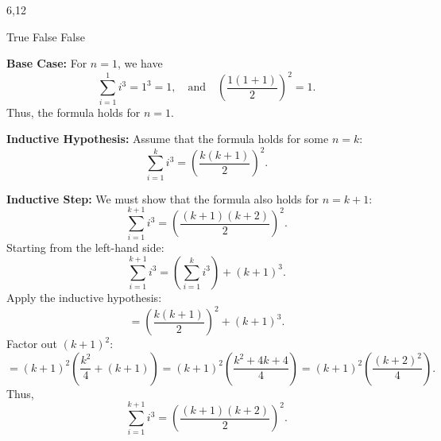 \documentclass[12pt,twoside]{article}
\begin{document}

\begin{problems}

\problem  %

\begin{problemparts}
\problempart %
{6,12}
\end{problemparts}

\problem  %

\begin{problemparts}
\end{problemparts}

\problem  %

\begin{problemparts}
\problempart %
True
\problempart %
False
\problempart %
False
\end{problemparts}

\problem  %


\textbf{Base Case:} For $n = 1$, we have
\[
\sum_{i=1}^1 i^3 = 1^3 = 1, \quad \text{and} \quad \left( \frac{1(1+1)}{2} \right)^2 = 1.
\]
Thus, the formula holds for $n = 1$.

\medskip

\textbf{Inductive Hypothesis:} Assume that the formula holds for some $n = k$:
\[
\sum_{i=1}^k i^3 = \left( \frac{k(k+1)}{2} \right)^2.
\]

\medskip

\textbf{Inductive Step:} We must show that the formula also holds for $n = k+1$:
\[
\sum_{i=1}^{k+1} i^3 = \left( \frac{(k+1)(k+2)}{2} \right)^2.
\]
Starting from the left-hand side:
\[
\sum_{i=1}^{k+1} i^3 = \left( \sum_{i=1}^k i^3 \right) + (k+1)^3.
\]
Apply the inductive hypothesis:
\[
= \left( \frac{k(k+1)}{2} \right)^2 + (k+1)^3.
\]
Factor out $(k+1)^2$:
\[
= (k+1)^2 \left( \frac{k^2}{4} + (k+1) \right)
= (k+1)^2 \left( \frac{k^2 + 4k + 4}{4} \right)
= (k+1)^2 \left( \frac{(k+2)^2}{4} \right).
\]
Thus,
\[
\sum_{i=1}^{k+1} i^3 = \left( \frac{(k+1)(k+2)}{2} \right)^2.
\]


\end{problems}
\end{document}
